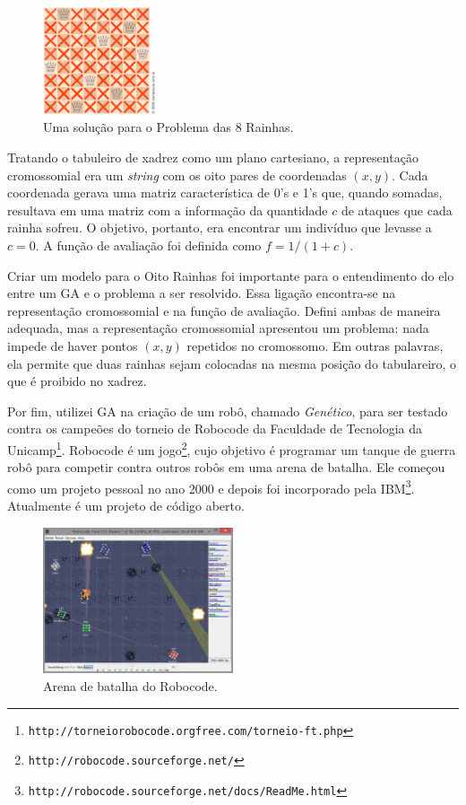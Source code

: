 	\begin{figure}[htbp]
		\centering
			\includegraphics[width=0.30\textwidth]{figs/materiais_metodo/ga/OitoRainhasSolucao.png}
		\caption{Uma solução para o Problema das 8 Rainhas.}
		\label{fig:OitoRainhasSolucao}
	\end{figure}
	
	Tratando o tabuleiro de xadrez como um plano cartesiano, a representação cromossomial era um \emph{string} com os oito pares de coordenadas $(x,y)$. Cada coordenada gerava uma matriz característica de 0's e 1's que, quando somadas, resultava em uma matriz com a informação da quantidade $c$ de ataques que cada rainha sofreu. O objetivo, portanto, era encontrar um indivíduo que levasse a $c = 0$. A função de avaliação foi definida como $f = 1/(1 + c)$.
	
	Criar um modelo para o Oito Rainhas foi importante para o entendimento do elo entre um GA e o problema a ser resolvido. Essa ligação encontra-se na representação cromossomial e na função de avaliação. Defini ambas de maneira adequada, mas a representação cromossomial apresentou um problema: nada impede de haver pontos $(x,y)$ repetidos no cromossomo. Em outras palavras, ela permite que duas rainhas sejam colocadas na mesma posição do tabulareiro, o que é proibido no xadrez. 
	
	Por fim, utilizei GA na criação de um robô, chamado \emph{Genético}, para ser testado contra os campeões do torneio de Robocode da Faculdade de Tecnologia da Unicamp\footnote{\texttt{http://torneiorobocode.orgfree.com/torneio-ft.php}}. Robocode é um jogo\footnote{\texttt{http://robocode.sourceforge.net/}}, cujo objetivo é programar um tanque de guerra robô para competir contra outros robôs em uma arena de batalha. Ele começou como um projeto pessoal no ano 2000 e depois foi incorporado pela IBM\footnote{\texttt{http://robocode.sourceforge.net/docs/ReadMe.html}}. Atualmente é um projeto de código aberto.
	
	\begin{figure}[htbp]
		\centering
			\includegraphics[width=0.50\textwidth]{figs/materiais_metodo/ga/Robocode_Battle_Field.PNG}
		\caption{Arena de batalha do Robocode.}
		\label{fig:Robocode}
	\end{figure}
	
